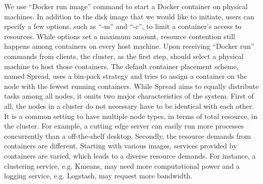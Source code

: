 We use ``Docker run image'' command to start a Docker container on physical machines. 
In addition to the disk image that we would like to
initiate, users can specify a few options, such as ``-m'' and ``-c'', to limit a container's access to resources. 
While options set a maximum amount, resource contention still happens among containers on every host machine.
Upon receiving ``Docker run'' commands from clients, the cluster, as the first step, should select a 
physical machine to host those containers.  The default container placement scheme, named Spread, uses a bin-pack strategy and tries to
assign a container on the node with the fewest running containers. 
While Spread aims to equally distribute tasks among all nodes, it omits two major characteristics of the system. First of all,
the nodes in a cluster do not necessary have to be identical with each other. It is a common setting to have multiple node types, 
in terms of total resource, in the cluster. For example, a cutting edge server can easily run more processes concurrently than a off-the-shelf desktop.
Secondly, the resource demands from containers are different. 
Starting with various images, services provided by containers are varied, which leads to a diverse resource demands. 
For instance, a clustering service, e.g. Kmeans, may need more computational power and a logging service, e.g. Logstash, 
may request more bandwidth. 

